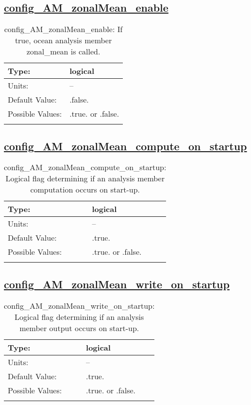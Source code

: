 \subsection[config\_AM\_zonalMean\_enable]{\hyperref[sec:nm_tab_AM_zonalMean]{config\_AM\_zonalMean\_enable}}
\label{subsec:nm_sec_config_AM_zonalMean_enable}
\begin{center}
\begin{longtable}{| p{2.0in} || p{4.0in} |}
    \hline
    Type: & logical \\
    \hline
    Units: & -- \\
    \hline
    Default Value: & .false. \\
    \hline
    Possible Values: & .true. or .false. \\
    \hline
    \caption{config\_AM\_zonalMean\_enable: If true, ocean analysis member zonal\_mean is called.}
\end{longtable}
\end{center}
\subsection[config\_AM\_zonalMean\_compute\_on\_startup]{\hyperref[sec:nm_tab_AM_zonalMean]{config\_AM\_zonalMean\_compute\_on\_startup}}
\label{subsec:nm_sec_config_AM_zonalMean_compute_on_startup}
\begin{center}
\begin{longtable}{| p{2.0in} || p{4.0in} |}
    \hline
    Type: & logical \\
    \hline
    Units: & -- \\
    \hline
    Default Value: & .true. \\
    \hline
    Possible Values: & .true. or .false. \\
    \hline
    \caption{config\_AM\_zonalMean\_compute\_on\_startup: Logical flag determining if an analysis member computation occurs on start-up.}
\end{longtable}
\end{center}
\subsection[config\_AM\_zonalMean\_write\_on\_startup]{\hyperref[sec:nm_tab_AM_zonalMean]{config\_AM\_zonalMean\_write\_on\_startup}}
\label{subsec:nm_sec_config_AM_zonalMean_write_on_startup}
\begin{center}
\begin{longtable}{| p{2.0in} || p{4.0in} |}
    \hline
    Type: & logical \\
    \hline
    Units: & -- \\
    \hline
    Default Value: & .true. \\
    \hline
    Possible Values: & .true. or .false. \\
    \hline
    \caption{config\_AM\_zonalMean\_write\_on\_startup: Logical flag determining if an analysis member output occurs on start-up.}
\end{longtable}
\end{center}
